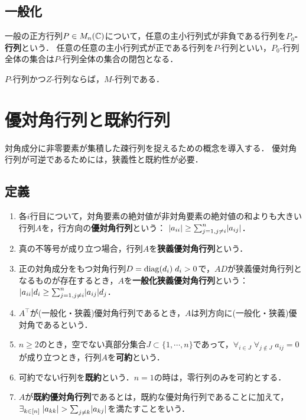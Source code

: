 \documentclass[uplatex, dvipdfmx]{jsreport}
\begin{document}
\subsection{一般化}

\begin{definition}
    一般の正方行列$P\in M_n(\mathbb{C})$について，任意の主小行列式が非負である行列を\textbf{$P_0$-行列}という．
    任意の任意の主小行列式が正である行列を$P$-行列といい，$P_0$-行列全体の集合は$P$-行列全体の集合の閉包となる．
\end{definition}

\begin{lemma}
    $P$-行列かつ$Z$-行列ならば，$M$-行列である．
\end{lemma}

\section{優対角行列と既約行列}

\begin{tcolorbox}[colframe=ForestGreen, colback=ForestGreen!10!white,breakable,colbacktitle=ForestGreen!40!white,coltitle=black,fonttitle=\bfseries\sffamily,
title=]
    対角成分に非零要素が集積した疎行列を捉えるための概念を導入する．
    優対角行列が可逆であるためには，狭義性と既約性が必要．
\end{tcolorbox}

\subsection{定義}

\begin{definition}\mbox{}
    \begin{enumerate}
        \item 各$i$行目について，対角要素の絶対値が非対角要素の絶対値の和よりも大きい行列$A$を，行方向の\textbf{優対角行列}という：
        $\lvert a_{ii}\rvert\ge\sum^n_{j=1,j\ne i}\lvert a_{ij}\rvert$．
        \item 真の不等号が成り立つ場合，行列$A$を\textbf{狭義優対角行列}という．
        \item 正の対角成分をもつ対角行列$D=\mathrm{diag}(d_i)\;d_i>0$で，$AD$が狭義優対角行列となるものが存在するとき，$A$を\textbf{一般化狭義優対角行列}という：$\lvert a_{ii}\rvert d_i\ge\sum^n_{j=1,j\ne i}\lvert a_{ij}\rvert d_j$．
        \item $A^\top$が(一般化・狭義)優対角行列であるとき，$A$は列方向に(一般化・狭義)優対角であるという．
        \item $n\ge 2$のとき，空でない真部分集合$J\subset\{1,\cdots,n\}$であって，$\forall_{i\in J}\;\forall_{j\notin J}\;a_{ij}=0$が成り立つとき，行列$A$を\textbf{可約}という．
        \item 可約でない行列を\textbf{既約}という．$n=1$の時は，零行列のみを可約とする．
        \item $A$が\textbf{既約優対角行列}であるとは，既約な優対角行列であることに加えて，$\exists_{k\in[n]}\;\lvert a_{kk}\rvert>\sum_{j\ne k}\lvert a_{kj}\rvert$を満たすことをいう．
    \end{enumerate}
\end{definition}
\end{document}
